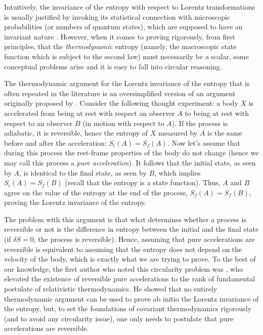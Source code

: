 \documentclass[twocolumn,usenatbib]{mnras2}
\begin{document}
Intuitively, the invariance of the entropy with respect to Lorentz transformations is usually justified by invoking its statistical connection with microscopic probabilities (or numbers of quantum states), which are supposed to have an invariant nature \citep{Nakamura2012,PARVAN2019}. However, when it comes to proving rigorously, from first principles, that the \textit{thermodynamic} entropy (namely, the macroscopic state function which is subject to the second law) must necessarily be a scalar, some conceptual problems arise and it is easy to fall into circular reasoning.

The thermodynamic argument for the Lorentz invariance of the entropy that is often repeated in the literature \citep{Farias2017,Mares2017} is an oversimplified version of an argument originally proposed by \cite{Planck_1908}. Consider the following thought experiment: a body $X$ is accelerated from being at rest with respect an observer $A$ to being at rest with respect to an observer $B$ (in motion with respect to $A$). If the process is adiabatic, it is reversible, hence the entropy of $X$ measured by $A$ is the same before and after the acceleration: $S_{i}(A)=S_f(A)$. Now let's assume that during this process the rest-frame properties of the body do not change (hence we may call this process a \textit{pure acceleration}). It follows that the initial state, as seen by $A$, is identical to the final state, as seen by $B$, which implies $S_i(A)=S_f(B)$ (recall that the entropy is a state function). Thus, $A$ and $B$ agree on the value of the entropy at the end of the process, $S_f(A)=S_f(B)$, proving the Lorentz invariance of the entropy. 

The problem with this argument is that what determines whether a process is reversible or not is the difference in entropy between the initial and the final state (if $\delta S=0$, the process is reversible). Hence, assuming that pure accelerations are reversible is equivalent to assuming that the entropy does not depend on the velocity of the body, which is exactly what we are trying to prove. To the best of our knowledge, the first author who noted this circularity problem was \cite{vanKampen1968}, who elevated the existence of reversible pure accelerations to the rank of fundamental postulate of relativistic thermodynamics. He showed that no entirely thermodynamic argument can be used to prove ab initio the Lorentz invariance of the entropy, but, to set the foundations of covariant thermodynamics rigorously (and to avoid any circularity issue), one only needs to postulate that pure accelerations are reversible.
\end{document}

